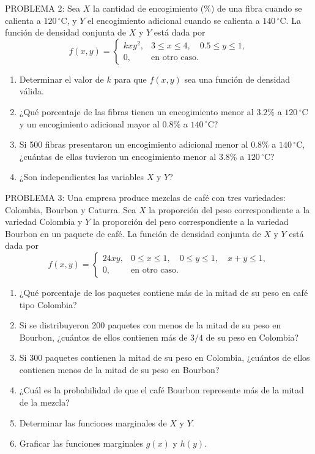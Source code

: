 \documentclass[10pt,letterpaper]{article}
\begin{document}
PROBLEMA 2: Sea \(X\) la cantidad de encogimiento (\%) de una fibra cuando se calienta a \(120\,^{\circ}\mathrm{C}\), y \(Y\) el encogimiento adicional cuando se calienta a \(140\,^{\circ}\mathrm{C}\). La función de densidad conjunta de \(X\) y \(Y\) está dada por
	\[
	f(x,y)=
	\begin{cases}
		kxy^2, & 3\leq x\leq4,\quad 0.5\leq y\leq1,\\
		0, & \text{en otro caso}.
	\end{cases}
	\]
	
	\begin{enumerate}
		\item Determinar el valor de \(k\) para que \(f(x,y)\) sea una función de densidad válida.
		\item ¿Qué porcentaje de las fibras tienen un encogimiento menor al \(3.2\%\) a \(120\,^{\circ}\mathrm{C}\) y un encogimiento adicional mayor al \(0.8\%\) a \(140\,^{\circ}\mathrm{C}\)?
		\item Si 500 fibras presentaron un encogimiento adicional menor al \(0.8\%\) a \(140\,^{\circ}\mathrm{C}\), ¿cuántas de ellas tuvieron un encogimiento menor al \(3.8\%\) a \(120\,^{\circ}\mathrm{C}\)?
		\item ¿Son independientes las variables \(X\) y \(Y\)?
	\end{enumerate}
PROBLEMA 3: Una empresa produce mezclas de café con tres variedades: Colombia, Bourbon y Caturra. Sea \(X\) la proporción del peso correspondiente a la variedad Colombia y \(Y\) la proporción del peso correspondiente a la variedad Bourbon en un paquete de café. La función de densidad conjunta de \(X\) y \(Y\) está dada por
	\[
	f(x,y)=
	\begin{cases}
		24xy, & 0\leq x\leq1,\quad 0\leq y\leq1,\quad x+y\leq1,\\
		0, & \text{en otro caso}.
	\end{cases}
	\]
	
	\begin{enumerate}
		\item ¿Qué porcentaje de los paquetes contiene más de la mitad de su peso en café tipo Colombia?
		\item Si se distribuyeron 200 paquetes con menos de la mitad de su peso en Bourbon, ¿cuántos de ellos contienen más de \(3/4\) de su peso en Colombia?
		\item Si 300 paquetes contienen la mitad de su peso en Colombia, ¿cuántos de ellos contienen menos de la mitad de su peso en Bourbon?
		\item ¿Cuál es la probabilidad de que el café Bourbon represente más de la mitad de la mezcla?
		\item Determinar las funciones marginales de \(X\) y \(Y\).
		\item Graficar las funciones marginales \(g(x)\) y \(h(y)\).
	\end{enumerate}
\end{document}
